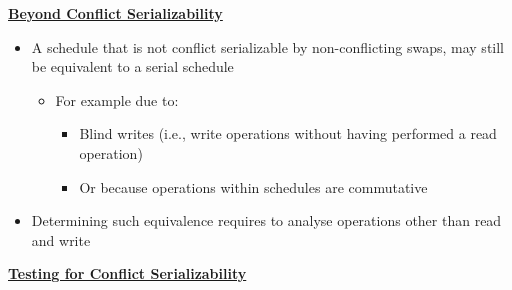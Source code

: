 \bigskip
\textbf{\underline{Beyond Conflict Serializability}}\\

\begin{itemize}[label=\(\rhd\)]
    \item A schedule that is not conflict serializable by non-conflicting swaps, may still be equivalent to a serial schedule
    \begin{itemize}[label=\(\rhd\)]
        \item For example due to:
        \begin{itemize}[label=\(\rhd\)]
            \item Blind writes (i.e., write operations without having performed a read operation) 
            \item Or because operations within schedules are commutative 
        \end{itemize}
    \end{itemize}
    \item Determining such equivalence requires to analyse operations other than read and write
\end{itemize}

\bigskip
\textbf{\underline{Testing for Conflict Serializability}}\\


